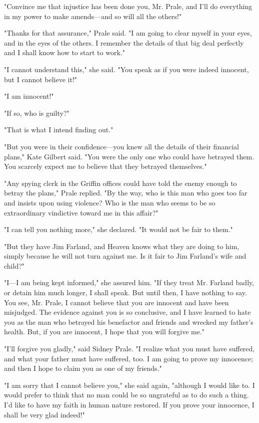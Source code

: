 \documentclass{novel}
\begin{document}
"Convince me that injustice has been done you, Mr. Prale, and I'll do everything in my power to make amends---and so will all the others!"

"Thanks for that assurance," Prale said. "I am going to clear myself in your eyes, and in the eyes of the others. I remember the details of that big deal perfectly and I shall know how to start to work."

"I cannot understand this," she said. "You speak as if you were indeed innocent, but I cannot believe it!"

"I am innocent!"

"If so, who is guilty?"

"That is what I intend finding out."

"But you were in their confidence---you knew all the details of their financial plans," Kate Gilbert said. "You were the only one who could have betrayed them. You scarcely expect me to believe that they betrayed themselves."

"Any spying clerk in the Griffin offices could have told the enemy enough to betray the plans," Prale replied. "By the way, who is this man who goes too far and insists upon using violence? Who is the man who seems to be so extraordinary vindictive toward me in this affair?"

"I can tell you nothing more," she declared. "It would not be fair to them."

"But they have Jim Farland, and Heaven knows what they are doing to him, simply because he will not turn against me. Is it fair to Jim Farland's wife and child?"

"I---I am being kept informed," she assured him. "If they treat Mr. Farland badly, or detain him much longer, I shall speak. But until then, I have nothing to say. You see, Mr. Prale, I cannot believe that you are innocent and have been misjudged. The evidence against you is so conclusive, and I have learned to hate you as the man who betrayed his benefactor and friends and wrecked my father's health. But, if you are innocent, I hope that you will forgive me."

"I'll forgive you gladly," said Sidney Prale. "I realize what you must have suffered, and what your father must have suffered, too. I am going to prove my innocence; and then I hope to claim you as one of my friends."

"I am sorry that I cannot believe you," she said again, "although I would like to. I would prefer to think that no man could be so ungrateful as to do such a thing. I'd like to have my faith in human nature restored. If you prove your innocence, I shall be very glad indeed!"
\end{document}
